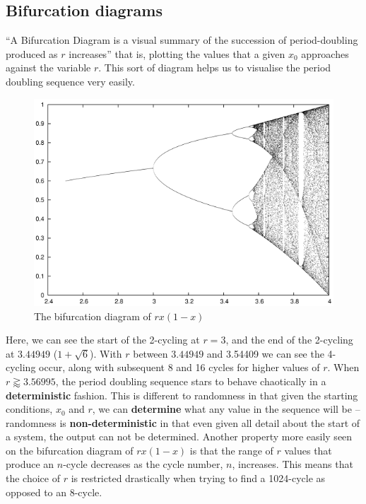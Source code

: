\documentclass[12pt]{article}
\begin{document}
\subsection{Bifurcation diagrams}
``A Bifurcation Diagram is a visual summary of the succession of period-doubling produced as $r$ increases'' that is, plotting the values that a given $x_0$ approaches against the variable $r$. This sort of diagram helps us to visualise the period doubling sequence very easily.
\begin{figure}[H]
	\centering
	\includegraphics[scale=1.6]{bif.png}
	\caption{The bifurcation diagram of $rx\left(1-x\right)$ \; \cite{bifdia}}
	\label{fig:percob2p85}
\end{figure}
Here, we can see the start of the 2-cycling at $r=3$, and the end of the 2-cycling at $3.44949$ ($1+\sqrt{6}$). With $r$ between $3.44949$ and 3.54409 \cite{4cyclim, logis} we can see the 4-cycling occur, along with subsequent 8 and 16 cycles for higher values of $r$. When $r\gtrapprox3.56995$\cite{allcyclim, logis}, the period doubling sequence stars to behave chaotically in a \textbf{deterministic} fashion. This is different to randomness in that given the starting conditions, $x_0$ and $r$, we can \textbf{determine} what any value in the sequence will be -- randomness is \textbf{non-deterministic} in that even given all detail about the start of a system, the output can not be determined.
Another property more easily seen on the bifurcation diagram of $rx\left(1-x\right)$ is that the range of $r$ values that produce an $n$-cycle decreases as the cycle number, $n$, increases. This means that the choice of $r$ is restricted drastically when trying to find a 1024-cycle as opposed to an 8-cycle.
\end{document}
